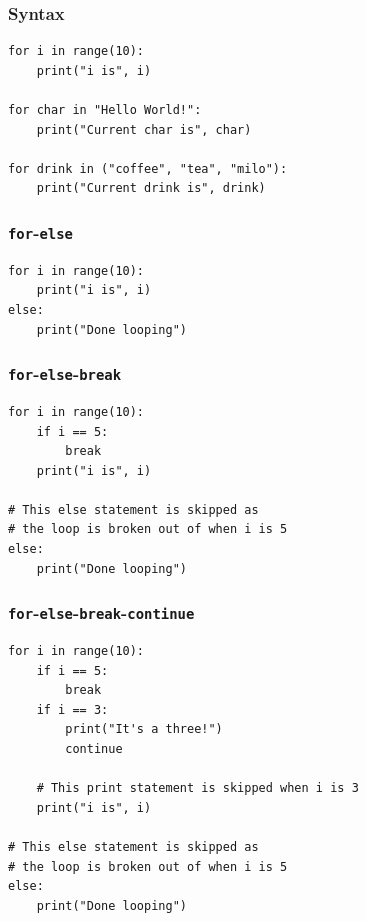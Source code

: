 \documentclass[11pt]{article}
\begin{document}
\subsubsection{Syntax}
\label{sec:org11e8347}
\begin{verbatim}
for i in range(10):
    print("i is", i)

for char in "Hello World!":
    print("Current char is", char)

for drink in ("coffee", "tea", "milo"):
    print("Current drink is", drink)
\end{verbatim}

\subsubsection{\texttt{for}-\texttt{else}}
\label{sec:org325b5a0}
\begin{verbatim}
for i in range(10):
    print("i is", i)
else:
    print("Done looping")
\end{verbatim}

\subsubsection{\texttt{for}-\texttt{else}-\texttt{break}}
\label{sec:org05886f7}
\begin{verbatim}
for i in range(10):
    if i == 5:
        break
    print("i is", i)

# This else statement is skipped as
# the loop is broken out of when i is 5
else:
    print("Done looping")
\end{verbatim}

\subsubsection{\texttt{for}-\texttt{else}-\texttt{break}-\texttt{continue}}
\label{sec:orga44cb10}
\begin{verbatim}
for i in range(10):
    if i == 5:
        break
    if i == 3:
        print("It's a three!")
        continue

    # This print statement is skipped when i is 3
    print("i is", i)

# This else statement is skipped as
# the loop is broken out of when i is 5
else:
    print("Done looping")
\end{verbatim}
\end{document}
